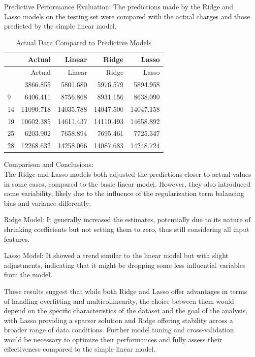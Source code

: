 \documentclass[
  12pt,
]{article}
\begin{document}
Predictive Performance Evaluation: The predictions made by the Ridge and
Lasso models on the testing set were compared with the actual charges
and those predicted by the simple linear model.

\begin{longtable}[]{@{}lrrrr@{}}
\caption{Actual Data Compared to Predictive Models}\tabularnewline
\toprule\noalign{}
& Actual & Linear & Ridge & Lasso \\
\midrule\noalign{}
\endfirsthead
\toprule\noalign{}
& Actual & Linear & Ridge & Lasso \\
\midrule\noalign{}
\endhead
\bottomrule\noalign{}
\endlastfoot
5 & 3866.855 & 5801.680 & 5976.579 & 5894.958 \\
9 & 6406.411 & 8756.868 & 8931.156 & 8638.090 \\
14 & 11090.718 & 14035.788 & 14047.500 & 14047.158 \\
19 & 10602.385 & 14611.437 & 14110.493 & 14658.892 \\
25 & 6203.902 & 7658.894 & 7695.461 & 7725.347 \\
28 & 12268.632 & 14258.066 & 14087.683 & 14248.724 \\
\end{longtable}

Comparison and Conclusions:\\
The Ridge and Lasso models both adjusted the predictions closer to
actual values in some cases, compared to the basic linear model.
However, they also introduced some variability, likely due to the
influence of the regularization term balancing bias and variance
differently:

Ridge Model: It generally increased the estimates, potentially due to
its nature of shrinking coefficients but not setting them to zero, thus
still considering all input features.

Lasso Model: It showed a trend similar to the linear model but with
slight adjustments, indicating that it might be dropping some less
influential variables from the model.

These results suggest that while both Ridge and Lasso offer advantages
in terms of handling overfitting and multicollinearity, the choice
between them would depend on the specific characteristics of the dataset
and the goal of the analysis, with Lasso providing a sparser solution
and Ridge offering stability across a broader range of data conditions.
Further model tuning and cross-validation would be necessary to optimize
their performances and fully assess their effectiveness compared to the
simple linear model.
\end{document}
